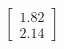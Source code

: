 \documentclass[preview]{standalone}
\begin{document}
\begin{align*}
\begin{bmatrix} 1.82 \\ 2.14 \end{bmatrix}
\end{align*}
\end{document}
